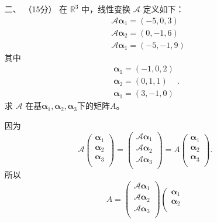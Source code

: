 \begin{enumerate}[1~]
\item[二、]（15分）
在 $\mathbb{R}^3$ 中，线性变换 $\mathscr{A}$ 定义如下：
\begin{align*}
& { \mathscr{A} } \boldsymbol{\alpha} _ { 1 }  = ( - 5,0,3 )\\
& { \mathscr{A} } \boldsymbol{\alpha} _ { 2 }  = ( 0 , - 1,6 )\\
& { \mathscr{A} } \boldsymbol{\alpha} _ { 1 }  = ( - 5 , - 1,9 )
\end{align*}
其中
\[
\begin{array} { l } { \boldsymbol{\alpha} _ { 1 } = ( - 1,0,2 ) } \\ { \boldsymbol{\alpha} _ { 2 } = ( 0,1,1 ) } \\ { \boldsymbol{\alpha} _ { 1 } = ( 3 , - 1,0 ) } \end{array}.
\]
求 $\mathscr{A}$ 在基$\boldsymbol{\alpha} _ { 1 } ,  \boldsymbol{\alpha} _ { 2 } ,  \boldsymbol{\alpha} _ { 3 }$下的矩阵$A$。
\begin{solution}
因为\[
\mathscr{A}\left( \begin{array}{c}
	\boldsymbol{\alpha} _1\\
	\boldsymbol{\alpha} _2\\
	\boldsymbol{\alpha} _3\\
\end{array} \right) =\left( \begin{array}{c}
	\mathscr{A}\boldsymbol{\alpha} _1\\
	\mathscr{A}\boldsymbol{\alpha} _2\\
	\mathscr{A}\boldsymbol{\alpha} _3\\
\end{array} \right) =A\left( \begin{array}{c}
	\boldsymbol{\alpha} _1\\
	\boldsymbol{\alpha} _2\\
	\boldsymbol{\alpha} _3\\
\end{array} \right) .
\]
所以\[
A=\left( \begin{array}{c}
	\mathscr{A}\boldsymbol{\alpha} _1\\
	\mathscr{A}\boldsymbol{\alpha} _2\\
	\mathscr{A}\boldsymbol{\alpha} _3\\
\end{array} \right) \left( \begin{array}{c}
	\boldsymbol{\alpha} _1\\
	\boldsymbol{\alpha} _2\\

\end{array}\]
\end{solution}
\end{enumerate}
